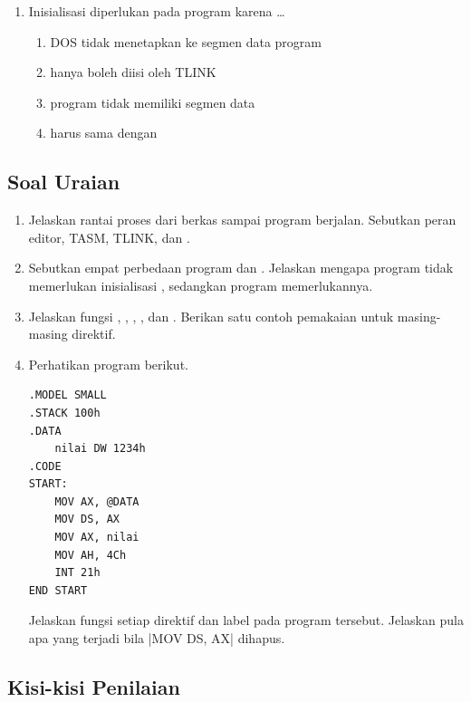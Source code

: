 \begin{enumerate}
    \item Inisialisasi  diperlukan pada program 
          karena \dots
          \begin{enumerate}
              \item DOS tidak menetapkan  ke segmen data
                    program
              \item {} hanya boleh diisi oleh TLINK
              \item program  tidak memiliki segmen data
              \item {} harus sama dengan 
          \end{enumerate}
\end{enumerate}

\subsection{Soal Uraian}

\begin{enumerate}
    \item Jelaskan rantai proses dari berkas  sampai
          program berjalan. Sebutkan peran editor, TASM, TLINK, dan
          .

    \item Sebutkan empat perbedaan program  dan
          . Jelaskan mengapa program  tidak
          memerlukan inisialisasi , sedangkan program
           memerlukannya.

    \item Jelaskan fungsi , , , ,
          dan . Berikan satu contoh pemakaian untuk
          masing-masing direktif.

    \item Perhatikan program berikut.
          \begin{lstlisting}[language=MASM, numbers=none]
.MODEL SMALL
.STACK 100h
.DATA
    nilai DW 1234h
.CODE
START:
    MOV AX, @DATA
    MOV DS, AX
    MOV AX, nilai
    MOV AH, 4Ch
    INT 21h
END START
          \end{lstlisting}
          Jelaskan fungsi setiap direktif dan label pada program
          tersebut. Jelaskan pula apa yang terjadi bila
          \lstasm|MOV DS, AX| dihapus.
\end{enumerate}

\subsection{Kisi-kisi Penilaian}

